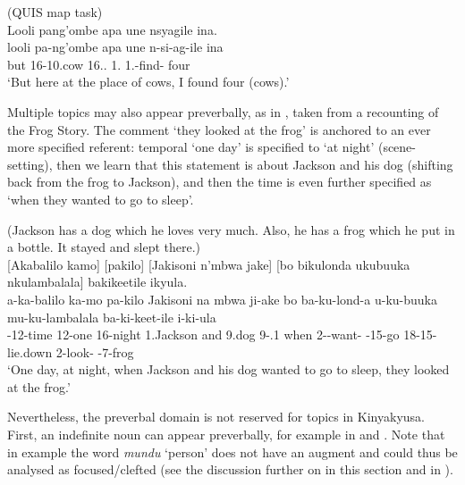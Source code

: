 \documentclass[output=paper]{langscibook}
\begin{document}
\ea
\label{bkm:Ref105322491}
(QUIS map task)\\
Looli pang’ombe apa une nsyagile ina.\\
\gll
looli  pa-ng’ombe  apa  une  n-si-ag-ile  ina\\
but  16-10.cow  16.\DEM.\PROX{}  1\SG.\PRO{}  1\SG.\OM{}-find-\PFV{}  four\\
\glt
‘But here at the place of cows, I found four (cows).’\\

\z


Multiple topics may also appear preverbally, as in , taken from a recounting of the Frog Story. The comment ‘they looked at the frog’ is anchored to an ever more specified referent: temporal ‘one day’ is specified to ‘at night’ (scene-setting), then we learn that this statement is about Jackson and his dog (shifting back from the frog to Jackson), and then the time is even further specified as ‘when they wanted to go to sleep’.\pagebreak

\ea
\label{bkm:Ref105322512}
(Jackson has a dog which he loves very much. Also, he has a frog which he put in a bottle. It stayed and slept there.)\\
{}[Akabalilo kamo] [pakilo] [Jakisoni n’mbwa jake] [bo bikulonda ukubuuka nkulambalala] bakikeetile ikyula.\\
\gll
a-ka-balilo  ka-mo  pa-kilo  Jakisoni  na  mbwa  ji-ake  bo  ba-ku-lond-a  u-ku-buuka  mu-ku-lambalala  ba-ki-keet-ile  i-ki-ula\\
\AUG{}-12-time  12-one  16-night  1.Jackson  and  9.dog  9-\POSS.1{}  when 2\SM-\PRS{}-want-\FV{}  \AUG{}-15-go  18-15-lie.down  2\OM{}-look-\PFV{}  \AUG{}-7-frog\\
\glt ‘One day, at night, when Jackson and his dog wanted to go to sleep, they looked at the frog.’

\z

Nevertheless, the preverbal domain is not reserved for topics in Kinyakyusa. First, an indefinite noun can appear preverbally, for example in  and . Note that in example  the word \textit{mundu} ‘person’ does not have an augment and could thus be analysed as focused/clefted (see the discussion further on in this section and in ).
\end{document}
